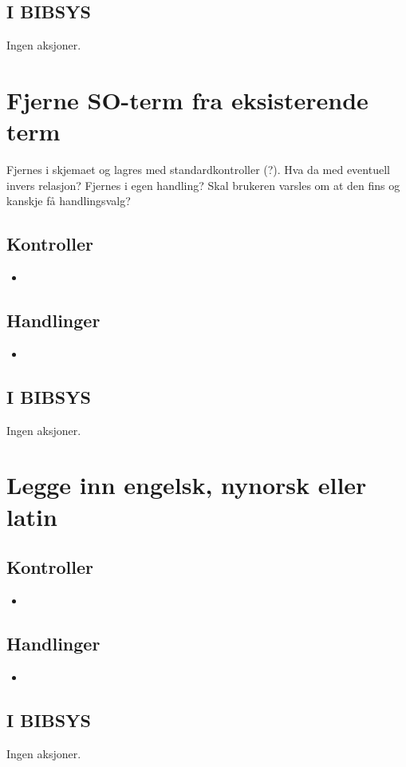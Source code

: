 \documentclass[a4paper,10pt,norsk]{article}
\begin{document}
\subsection*{I BIBSYS}
Ingen aksjoner.

\section{Fjerne SO-term fra eksisterende term}
Fjernes i skjemaet og lagres med standardkontroller (?). Hva da med eventuell invers relasjon? Fjernes i egen handling? Skal brukeren varsles om at den fins og kanskje få handlingsvalg?
\subsection*{Kontroller}
\begin{itemize}
\item 
\end{itemize}
\subsection*{Handlinger}
\begin{itemize}
\item 
\end{itemize}
\subsection*{I BIBSYS}
Ingen aksjoner.

\section{Legge inn engelsk, nynorsk eller latin}
\subsection*{Kontroller}
\begin{itemize}
\item 
\end{itemize}
\subsection*{Handlinger}
\begin{itemize}
\item 
\end{itemize}
\subsection*{I BIBSYS}
Ingen aksjoner.
\end{document}
